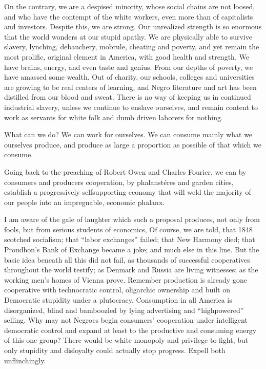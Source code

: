 \documentclass[letterpaper,10pt,english]{jupyterBook}
\begin{document}
\sphinxAtStartPar
On the contrary, we are a despised minority, whose social chains are not loosed, and who have the contempt of the white workers, even more than of capitalists and investors. Despite this, we are strong. Our unrealized strength is so enormous that the world wonders at our stupid apathy. We are physically able to survive slavery, lynching, debauchery, mob\sphinxhyphen{}rule, cheating and poverty, and yet remain the most prolific, original element in America, with good health and strength. We have brains, energy, and even taste and genius. From our depths of poverty, we have amassed some wealth. Out of charity, our schools, colleges and universities are growing to be real centers of learning, and Negro literature and art has been distilled from our blood and sweat. There is no way of keeping us in continued industrial slavery, unless we continue to enslave ourselves, and remain content to work as servants for white folk and dumb driven laborers for nothing.



\sphinxAtStartPar
What can we do? We can work for ourselves. We can consume mainly what we ourselves produce, and produce as large a proportion as possible of that which we consume.

\sphinxAtStartPar
Going back to the preaching of Robert Owen and Charles Fourier, we can by consumers and producers cooperation, by phalanstéres and garden cities, establish a progressively self\sphinxhyphen{}supporting economy that will weld the majority of our people into an impregnable, economic phalanx.

\sphinxAtStartPar
I am aware of the gale of laughter which such a proposal produces, not only from fools, but from serious students of economics, Of course, we are told, that 1848 scotched socialism; that “labor exchanges” failed; that New Harmony died; that Proudhon’s Bank of Exchange became a joke; and much else in this line. But the basic idea beneath all this did not fail, as thousands of successful co\sphinxhyphen{}operatives throughout the world testify; as Denmark and Russia are living witnesses; as the working men’s homes of Vienna prove. Remember production is already gone co\sphinxhyphen{}operative with technocratic control, oligarchic ownership and built on Democratic stupidity under a plutocracy. Consumption in all America is disorganized, blind and bamboozled by lying advertising and “high\sphinxhyphen{}powered” selling. Why may not Negroes begin consumers’ co\sphinxhyphen{}operation under intelligent democratic control and expand at least to the productive and consuming energy of this one group? There would be white monopoly and privilege to fight, but only stupidity and disloyalty could actually stop progress. Expell both unflinchingly.
\end{document}

